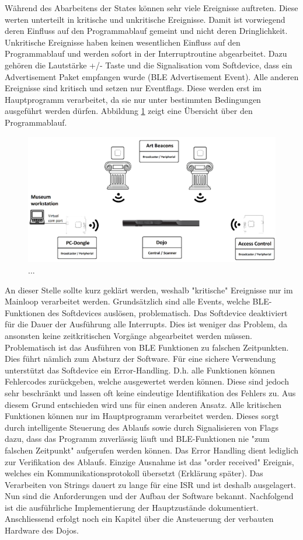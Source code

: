 Während des Abarbeitens der States können sehr viele Ereignisse auftreten. Diese werten unterteilt in kritische und unkritische Ereignisse. Damit ist vorwiegend deren Einfluss auf den Programmablauf gemeint und nicht deren Dringlichkeit. 
Unkritische Ereignisse haben keinen wesentlichen Einfluss auf den Programmablauf und werden sofort in der Interruptroutine abgearbeitet. Dazu gehören die Lautstärke +/- Taste und die Signalisation vom Softdevice, dass ein Advertisement Paket empfangen wurde (BLE Advertisement Event).
Alle anderen Ereignisse sind kritisch und setzen nur Eventflags. Diese werden erst im Hauptprogramm verarbeitet, da sie nur unter bestimmten Bedingungen ausgeführt werden dürfen. Abbildung \ref{fig:soft_2} zeigt eine Übersicht über den Programmablauf. 
\begin{figure}[h]
	\centering
	\includegraphics[width=\textwidth]{graphics/platzhalter.png}
	\caption{ ... }
	\label{fig:soft_2}
\end{figure}
An dieser Stelle sollte kurz geklärt werden, weshalb "kritische" Ereignisse nur im Mainloop verarbeitet werden.
Grundsätzlich sind alle Events, welche BLE-Funktionen des Softdevices auslösen, problematisch. Das Softdevice deaktiviert für die Dauer der Ausführung alle Interrupts. Dies ist weniger das Problem, da ansonsten keine zeitkritischen Vorgänge abgearbeitet werden müssen. Problematisch ist das Ausführen von BLE Funktionen zu falschen Zeitpunkten. Dies führt nämlich zum Absturz der Software. Für eine sichere Verwendung unterstützt das Softdevice ein Error-Handling. D.h. alle Funktionen können Fehlercodes zurückgeben, welche ausgewertet werden können. Diese sind jedoch sehr beschränkt und lassen oft keine eindeutige Identifikation des Fehlers zu. Aus diesem Grund entschieden wird uns für einen anderen Ansatz. Alle kritischen Funktionen können nur im Hauptprogramm verarbeitet werden. Dieses sorgt durch intelligente Steuerung des Ablaufs sowie durch Signalisieren von Flags dazu, dass das Programm zuverlässig läuft und BLE-Funktionen nie "zum falschen Zeitpunkt" aufgerufen werden können. Das Error Handling dient lediglich zur Verifikation des Ablaufs.
Einzige Ausnahme ist das "order received" Ereignis, welches ein Kommunikationsprotokoll übersetzt (Erklärung später). Das Verarbeiten von Strings dauert zu lange für eine ISR und ist deshalb ausgelagert.
Nun sind die Anforderungen und der Aufbau der Software bekannt. Nachfolgend ist die ausführliche Implementierung der Hauptzustände dokumentiert. Anschliessend erfolgt noch ein Kapitel über die Ansteuerung der verbauten Hardware des Dojos.

